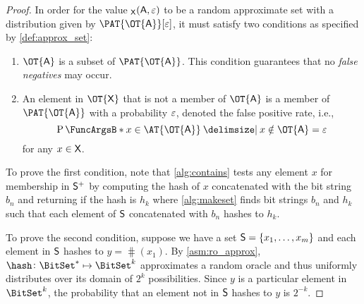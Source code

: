 \documentclass[ ../main.tex]{subfiles}
\begin{document}
\begin{proof}
In order for the value $\bf_{\Set{X}}(\Set{A},\fprate)$ to be a random approximate set with a distribution given by $\PAT{\OT{\Set{A}}}[\fprate]$, it must satisfy two conditions as specified by \cref{def:approx_set}:
\begin{enumerate}
	\item $\OT{\Set{A}}$ is a subset of $\PAT{\OT{\Set{A}}}$.
	This condition guarantees that no \emph{false negatives} may occur.
	\item An element in $\OT{\Set{X}}$ that is not a member of $\OT{\Set{A}}$ is a member 
	of $\PAT{\OT{\Set{A}}}$ with a probability $\varepsilon$, denoted the false positive rate, 
	i.e.,
	\begin{equation}
	\Prob{x \in \AT{\OT{\Set{A}}} \Given x \notin \OT{\Set{A}}} = \fprate
	\end{equation}
	for any $x \in \Set{X}$.
\end{enumerate}

To prove the first condition, note that \cref{alg:contains} tests any element $x$ for membership in $\PASet{S}$ by computing the hash of $x$ concatenated with the bit string $b_n$ and returning \True if the hash is $h_k$ where \cref{alg:makeset} finds bit strings $b_n$ and $h_k$ such that each element of $\Set{S}$ concatenated with $b_n$ hashes to $h_k$.

To prove the second condition, suppose we have a set $\Set{S} = \{x_1,\ldots,x_m\}$ and each element in $\Set{S}$ hashes to $y = \hash(x_1)$. By \cref{asm:ro_approx}, $\hash \colon \BitSet^* \mapsto \BitSet^k$ approximates a random oracle and thus uniformly distributes over its domain of $2^k$ possibilities. Since $y$ is a particular element in $\BitSet^k$, the probability that an element not in $\Set{S}$ hashes to $y$ is $2^{-k}$.
\end{proof}
\end{document}
